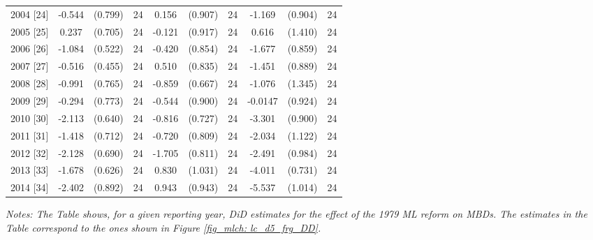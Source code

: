 \begin{table}[H]
\begin{threeparttable}
{\begin{tabular}{l*{9}{c}}
				2004 [24]	&      -0.544         &     (0.799) &	24	&       0.156         &     (0.907)	& 24	&      -1.169         &     (0.904)	& 24	\\
				2005 [25]	&       0.237         &     (0.705) &	24	&      -0.121         &     (0.917)	& 24	&       0.616         &     (1.410)	& 24	\\
				2006 [26]	&      -1.084\sym{**} &     (0.522) &	24	&      -0.420         &     (0.854)	& 24	&      -1.677\sym{*}  &     (0.859)	& 24	\\
				2007 [27]	&      -0.516         &     (0.455) &	24	&       0.510         &     (0.835)	& 24	&      -1.451         &     (0.889)	& 24	\\
				2008 [28]	&      -0.991         &     (0.765) &	24	&      -0.859         &     (0.667)	& 24	&      -1.076         &     (1.345)	& 24	\\
				2009 [29]	&      -0.294         &     (0.773) &	24	&      -0.544         &     (0.900)	& 24	&     -0.0147         &     (0.924)	& 24	\\
				2010 [30]	&      -2.113\sym{***}&     (0.640) &	24	&      -0.816         &     (0.727)	& 24	&      -3.301\sym{***}&     (0.900)	& 24	\\
				2011 [31]	&      -1.418\sym{*}  &     (0.712) &	24	&      -0.720         &     (0.809)	& 24	&      -2.034\sym{*}  &     (1.122)	& 24	\\
				2012 [32]	&      -2.128\sym{***}&     (0.690) &	24	&      -1.705\sym{**} &     (0.811)	& 24	&      -2.491\sym{**} &     (0.984)	& 24	\\
				2013 [33]	&      -1.678\sym{**} &     (0.626) &	24	&       0.830         &     (1.031)	& 24	&      -4.011\sym{***}&     (0.731)	& 24	\\
				2014 [34]	&      -2.402\sym{**} &     (0.892) &	24	&       0.943         &     (0.943)	& 24	&      -5.537\sym{***}&     (1.014)	& 24	\\
				\bottomrule 
		\end{tabular}}
		\begin{tablenotes} 
			\item \scriptsize \emph{Notes: The Table shows, for a given reporting year, DiD estimates for the effect of the 1979 ML reform on MBDs. The estimates in the Table correspond to the ones shown in Figure \ref{fig_mlch: lc_d5_frg_DD}.} 
		\end{tablenotes} 
	\end{threeparttable} 
\end{table}